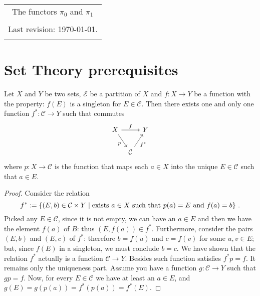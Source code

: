 





\begin{center}
\begin{tabular}{c}
{\Large The functors \(\pi_0\) and \(\pi_1\)} \\
\\
Last revision: \today{}.\\
\\
\bottomrule
\end{tabular}
\end{center}

\tableofcontents

\section{Set Theory prerequisites}

\begin{lemma}\label{lemma:SetIso1}
Let \(X\) and \(Y\) be two sets, \(\mathcal E\) be a partition of \(X\) and \(f : X \to Y\) be a function with the property: \(f(E)\) is a singleton for \(E \in \mathcal C\). Then there exists one and only one function \(f^\ast : \mathcal C \to Y\) such that commutes
\[\begin{tikzcd}[column sep=tiny]
X \ar["f", rr] \ar["p", swap, dr] & & Y \\
& \mathcal C \ar["{f^\ast}", swap, ur]
\end{tikzcd}\]
where \(p : X \to \mathcal C\) is the function that maps each \(a \in X\) into the unique \(E \in \mathcal C\) such that \(a \in E\).%
\end{lemma}

\begin{proof}
Consider the relation
\[f^\ast := \left\{(E, b) \in \mathcal C \times Y \mid \text{exists } a \in X \text{ such that } p(a) = E \text{ and } f(a) = b\right\}\,.\] 
Picked any \(E \in \mathcal C\), since it is not empty, we can have an \(a \in E\) and then we have the element \(f(a)\) of \(B\): thus \((E, f(a)) \in f^\ast\). Furthermore, consider the pairs \((E, b)\) and \((E, c)\) of \(f^\ast\): therefore \(b = f(u)\) and \(c = f(v)\) for some \(u, v \in E\); but, since \(f(E)\) in a singleton, we must conclude \(b = c\). We have shown that the relation \(f^\ast\) actually is a function \(\mathcal C \to Y\). Besides such function satisfies \(f^\ast p = f\). It remains only the uniqueness part. Assume you have a function \(g : \mathcal C \to Y\) such that \(gp = f\). Now, for every \(E \in \mathcal C\) we have at least an \(a \in E\), and \(g(E) = g(p(a)) = f^\ast (p(a)) = f^\ast(E)\).
\end{proof}

